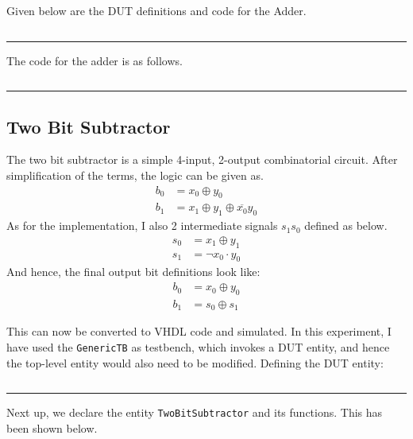\documentclass[a4paper, 11pt]{article}
\begin{document}
Given below are the DUT definitions and code for the Adder.


\inputminted[linenos]{vhdl}{Submission/TwoBitAdder/DUT.vhd}
\hrule
\vspace*{2mm}
The code for the adder is as follows.


\inputminted[linenos]{vhdl}{Submission/TwoBitAdder/TwoBitAdder.vhd}
\hrule
\vspace*{2mm}

\subsection{Two Bit Subtractor}

The two bit subtractor is a simple 4-input, 2-output combinatorial circuit. After simplification of the terms, the logic can be given as.
\begin{equation}
\begin{split}
b_0 &= x_0 \oplus y_0 \\
b_1 &= x_1 \oplus y_1 \oplus \overline{x_0}y_0
\end{split}
\end{equation}
As for the implementation, I also 2 intermediate signals $s_1s_0$ defined as below.
\begin{equation}
\begin{split}
s_0 &= x_1 \oplus y_1 \\
s_1 &= \neg x_0 \cdot y_0
\end{split}
\end{equation}
And hence, the final output bit definitions look like:
\begin{equation}
\begin{split}
b_0 &= x_0 \oplus y_0 \\
b_1 &= s_0 \oplus s_1
\end{split}
\end{equation}

This can now be converted to VHDL code and simulated. In this experiment, I have used the \texttt{GenericTB} as testbench, which invokes a DUT entity, and hence the top-level entity would also need to be modified. Defining the DUT entity:

\inputminted[linenos]{vhdl}{Submission/TwoBitSubtractor/DUT.vhd}

\hrule
\vspace*{2mm}
Next up, we declare the entity \texttt{TwoBitSubtractor} and its functions. This has been shown below.

\inputminted[linenos]{vhdl}{Submission/TwoBitSubtractor/TwoBitSubtractor.vhd}
\end{document}
